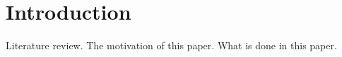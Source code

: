 \section{Introduction}
Literature review.
The motivation of this paper.
What is done in this paper.





